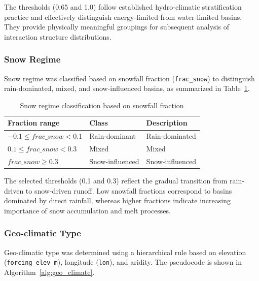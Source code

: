 \documentclass[11pt]{article}
\begin{document}
The thresholds (0.65 and 1.0) follow established hydro-climatic stratification practice and effectively distinguish energy-limited from water-limited basins\cite{hess-24-1081-2020}. They provide physically meaningful groupings for subsequent analysis of interaction structure distributions.

\subsubsection*{Snow Regime}

Snow regime was classified based on snowfall fraction (\texttt{frac\_snow}) to distinguish rain-dominated, mixed, and snow-influenced basins, as summarized in Table~\ref{tab:snow_regime}\cite{Berghuijs2014}.

\begin{table}[htbp]
    \centering
    \caption{Snow regime classification based on snowfall fraction}
    \label{tab:snow_regime}
    \begin{tabular*}{\textwidth}{@{\extracolsep{\fill}}lll}
        \toprule
        \textbf{Fraction range} & \textbf{Class} & \textbf{Description} \\
        \midrule
        $-0.1 \le frac\_snow < 0.1$ & Rain-dominant & Rain-dominated \\
        $0.1 \le frac\_snow < 0.3$ & Mixed & Mixed \\
        $frac\_snow \ge 0.3$ & Snow-influenced & Snow-influenced \\
        \bottomrule
    \end{tabular*}
\end{table}

The selected thresholds (0.1 and 0.3) reflect the gradual transition from rain-driven to snow-driven runoff. Low snowfall fractions correspond to basins dominated by direct rainfall, whereas higher fractions indicate increasing importance of snow accumulation and melt processes\cite{Biemans2019}.

\subsubsection*{Geo-climatic Type}

Geo-climatic type was determined using a hierarchical rule based on elevation (\texttt{forcing\_elev\_m}), longitude (\texttt{lon}), and aridity\cite{hess-24-1081-2020}. The pseudocode is shown in Algorithm~\ref{alg:geo_climate}.
\end{document}
